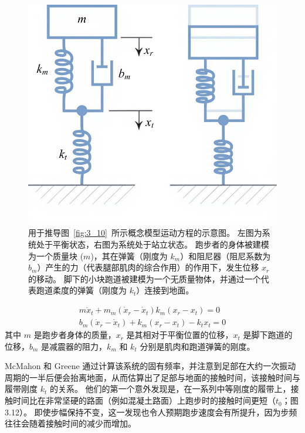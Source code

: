 \begin{figure}[!htb]
	\centering
	\includegraphics[width=1.0\linewidth]{chap3/3_11}
	\caption{用于推导图~\ref{fig:3_10}~所示概念模型运动方程的示意图。
		左图为系统处于平衡状态，右图为系统处于站立状态。
		跑步者的身体被建模为一个质量块 ($m$)，其在弹簧（刚度为 $k_m$）和阻尼器（阻尼系数为 $b_m$）产生的力（代表腿部肌肉的综合作用）的作用下，发生位移 $x_r$ 的移动。
		脚下的小块跑道被建模为一个无质量物体，并通过一个代表跑道柔度的弹簧（刚度为 $k_t$）连接到地面\cite{mcmahon1979influence}。 \label{fig:3_11}}
\end{figure}

\begin{equation}
\begin{aligned}
	m \ddot{x}_t + 
	m_m ( \dot{x}_r - \dot{x}_t )
	k_m ( x_r - x_t ) = 0 \\
	b_m ( \dot{x}_r - \dot{x}_t )
	+ k_m ( x_r - x_t ) 
	- k_t x_t = 0
\end{aligned}
\end{equation}
% 
其中 $m$ 是跑步者身体的质量，$x_r$ 是其相对于平衡位置的位移，$x_t$ 是脚下跑道的位移，$b_m$ 是减震器的阻力，$k_m$ 和 $k_t$ 分别是肌肉和跑道弹簧的刚度。


McMahon 和 Greene 通过计算该系统的固有频率，并注意到足部在大约一次振动周期的一半后便会抬离地面，从而估算出了足部与地面的接触时间，该接触时间与履带刚度 $k_t$ 的关系。
他们的第一个意外发现是，在一系列中等刚度的履带上，接触时间比在非常坚硬的路面（例如混凝土路面）上跑步时的接触时间更短（$t_0$；图 3.12）。
即使步幅保持不变，这一发现也令人预期跑步速度会有所提升，因为步频往往会随着接触时间的减少而增加。








